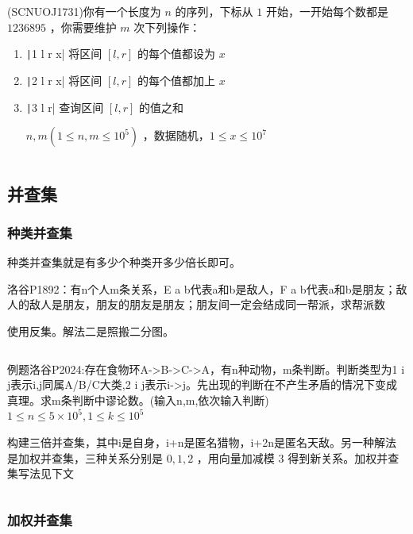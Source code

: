 \documentclass[twocolumn,10pt]{ctexart}
\begin{document}
\begin{notebox}
(SCNUOJ1731)你有一个长度为 $n$ 的序列，下标从 $1$ 开始，一开始每个数都是 $1236895$ ，你需要维护 $m$ 次下列操作：

\begin{enumerate}
\item \texttt|1 l r x| 将区间 $[l,r]$ 的每个值都设为 $x$
\item \texttt|2 l r x| 将区间 $[l,r]$ 的每个值都加上 $x$
\item \texttt|3 l r| 查询区间 $[l,r]$ 的值之和

$n,m(1\le n,m\le10^5)$ ，数据随机，$1\le x\le10^7$
\end{enumerate}
\end{notebox}

\inputminted{cpp}{code/ext_026.cpp}

\subsection{并查集}

\subsubsection{种类并查集}

种类并查集就是有多少个种类开多少倍长即可。

\begin{notebox}
洛谷P1892：有n个人m条关系，E a b代表a和b是敌人，F a b代表a和b是朋友；敌人的敌人是朋友，朋友的朋友是朋友；朋友间一定会结成同一帮派，求帮派数
\end{notebox}

使用反集。解法二是照搬二分图。

\inputminted{cpp}{code/ext_027.cpp}

\begin{notebox}
例题洛谷P2024:存在食物环A->B->C->A，有n种动物，m条判断。判断类型为1 i j表示i,j同属A/B/C大类,2 i j表示i->j。先出现的判断在不产生矛盾的情况下变成真理。求m条判断中谬论数。(输入n,m,依次输入判断) $1\le n\le5\times10^5,\allowbreak{}1\le k\le10^5$
\end{notebox}

构建三倍并查集，其中i是自身，i+n是匿名猎物，i+2n是匿名天敌。另一种解法是加权并查集，三种关系分别是 $0,1,2$ ，用向量加减模 $3$ 得到新关系。加权并查集写法见下文

\inputminted{cpp}{code/p2024_disjointset.cpp}

\subsubsection{加权并查集}
\end{document}
